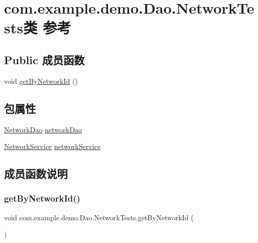 \hypertarget{classcom_1_1example_1_1demo_1_1_dao_1_1_network_tests}{}\section{com.\+example.\+demo.\+Dao.\+Network\+Tests类 参考}
\label{classcom_1_1example_1_1demo_1_1_dao_1_1_network_tests}
\subsection*{Public 成员函数}
\begin{DoxyCompactItemize}
\item 
void \mbox{\hyperlink{classcom_1_1example_1_1demo_1_1_dao_1_1_network_tests_aea9e76d8abf35689bf429ebff10672c2}{get\+By\+Network\+Id}} ()
\end{DoxyCompactItemize}
\subsection*{包属性}
\begin{DoxyCompactItemize}
\item 
\mbox{\hyperlink{interfacecom_1_1example_1_1demo_1_1dao_1_1_network_dao}{Network\+Dao}} \mbox{\hyperlink{classcom_1_1example_1_1demo_1_1_dao_1_1_network_tests_ab06158b395cce0f94d465f4af25d89ef}{network\+Dao}}
\item 
\mbox{\hyperlink{classcom_1_1example_1_1demo_1_1service_1_1_network_service}{Network\+Service}} \mbox{\hyperlink{classcom_1_1example_1_1demo_1_1_dao_1_1_network_tests_a19561ad7fbf14242d9ddb0f8a618df0d}{network\+Service}}
\end{DoxyCompactItemize}


\subsection{成员函数说明}
\mbox{\label{classcom_1_1example_1_1demo_1_1_dao_1_1_network_tests_aea9e76d8abf35689bf429ebff10672c2}} 
\subsubsection{\texorpdfstring{get\+By\+Network\+Id()}{getByNetworkId()}}
{\footnotesize\ttfamily void com.\+example.\+demo.\+Dao.\+Network\+Tests.\+get\+By\+Network\+Id (\begin{DoxyParamCaption}{ }\end{DoxyParamCaption})}



